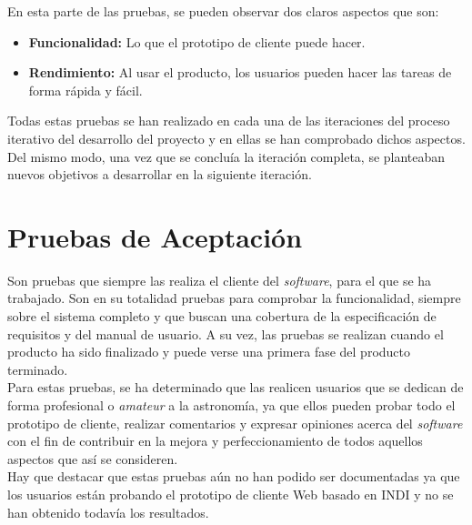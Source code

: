 En esta parte de las pruebas, se pueden observar dos claros aspectos que son:
\begin{itemize}
  \item \textbf{Funcionalidad:} Lo que el prototipo de cliente puede hacer.
  \item \textbf{Rendimiento:} Al usar el producto, los usuarios pueden hacer las tareas de forma rápida y fácil.
\end{itemize}
Todas estas pruebas se han realizado en cada una de las iteraciones del proceso iterativo del desarrollo del proyecto y en ellas se han comprobado dichos aspectos. Del mismo modo, una vez que se concluía  la iteración completa, se planteaban nuevos objetivos a desarrollar en la siguiente iteración.

\section{Pruebas de Aceptación}
Son pruebas que siempre las realiza el cliente del \textit{software}, para el que se ha trabajado.
Son en su totalidad pruebas para comprobar la funcionalidad, siempre sobre el sistema completo y que buscan una cobertura de la especificación de requisitos y del manual de usuario. A su vez, las pruebas se realizan cuando el producto ha sido finalizado y puede verse una primera fase del producto terminado.\\

Para estas pruebas, se ha determinado que las realicen usuarios que se dedican de forma profesional o \textit{amateur} a la astronomía, ya que ellos pueden probar todo el prototipo de cliente, realizar comentarios y expresar opiniones acerca del \textit{software} con el fin de contribuir en la mejora y perfeccionamiento de todos aquellos aspectos que así se consideren. \\

Hay que destacar que estas pruebas aún no han podido ser documentadas ya que los usuarios están probando el prototipo de cliente Web basado en INDI y no se han obtenido todavía los resultados.
